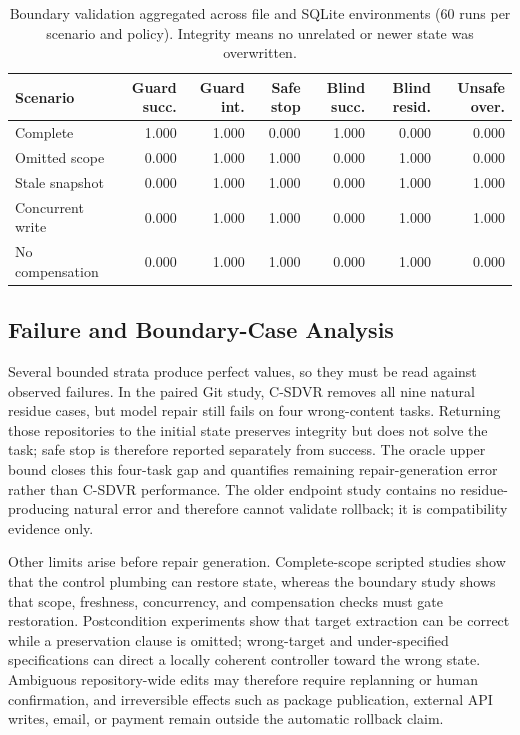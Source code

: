 \documentclass[pdflatex,sn-apa]{sn-jnl}
\begin{document}
\begin{table}[htbp]
\centering
\caption{Boundary validation aggregated across file and SQLite environments (60 runs per scenario and policy). Integrity means no unrelated or newer state was overwritten.}
\label{tab:boundaries}
\scriptsize
\setlength{\tabcolsep}{1.5pt}
\begin{tabular}{lrrrrrr}
\toprule
Scenario & Guard succ. & Guard int. & Safe stop & Blind succ. & Blind resid. & Unsafe over. \\
\midrule
Complete & 1.000 & 1.000 & 0.000 & 1.000 & 0.000 & 0.000 \\
Omitted scope & 0.000 & 1.000 & 1.000 & 0.000 & 1.000 & 0.000 \\
Stale snapshot & 0.000 & 1.000 & 1.000 & 0.000 & 1.000 & 1.000 \\
Concurrent write & 0.000 & 1.000 & 1.000 & 0.000 & 1.000 & 1.000 \\
No compensation & 0.000 & 1.000 & 1.000 & 0.000 & 1.000 & 0.000 \\
\bottomrule
\end{tabular}
\end{table}

\subsection{Failure and Boundary-Case Analysis}

Several bounded strata produce perfect values, so they must be read against observed failures. In the paired Git study, C-SDVR removes all nine natural residue cases, but model repair still fails on four wrong-content tasks. Returning those repositories to the initial state preserves integrity but does not solve the task; safe stop is therefore reported separately from success. The oracle upper bound closes this four-task gap and quantifies remaining repair-generation error rather than C-SDVR performance. The older endpoint study contains no residue-producing natural error and therefore cannot validate rollback; it is compatibility evidence only.

Other limits arise before repair generation. Complete-scope scripted studies show that the control plumbing can restore state, whereas the boundary study shows that scope, freshness, concurrency, and compensation checks must gate restoration. Postcondition experiments show that target extraction can be correct while a preservation clause is omitted; wrong-target and under-specified specifications can direct a locally coherent controller toward the wrong state. Ambiguous repository-wide edits may therefore require replanning or human confirmation, and irreversible effects such as package publication, external API writes, email, or payment remain outside the automatic rollback claim.
\end{document}
